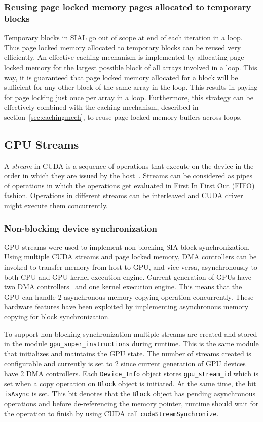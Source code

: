 \subsubsection{Reusing page locked memory pages allocated to temporary blocks}
Temporary blocks in SIAL go out of scope at end of each iteration in a loop. Thus page
locked memory allocated to temporary blocks can be reused very efficiently.
An effective caching mechanism is implemented by allocating page locked memory
for the largest possible block of all arrays involved in a loop. This
way, it is guaranteed that page locked memory allocated for a block will
be sufficient for any other block of the same array in the loop. This results
in paying for page locking just once per array in a loop. Furthermore, this
strategy can be effectively combined with the caching mechanism, described
in section~\ref{sec:cachingmech}, to reuse page locked memory buffers across
loops.

\subsection{GPU Streams}
A \textit{stream} in CUDA is a sequence of operations that execute on the device
in the order in which they are issued by the host~\cite{overlapdatatransfer}.
Streams can be considered as pipes of operations in which the operations get evaluated in
First In First Out (FIFO) fashion. Operations in different streams can be interleaved
and CUDA driver might execute them concurrently.

\subsubsection{Non-blocking device synchronization}\label{nonblockdevicesync}
GPU streams were used to implement non-blocking SIA block synchronization. Using
multiple CUDA streams and page locked memory, DMA controllers can be invoked to
transfer memory from host to GPU, and vice-versa, asynchronously to both CPU and GPU
kernel execution engine. Current generation of GPUs have two DMA
controllers~\cite{teslaspecs, teslakspecs} and one kernel execution engine.
This means that the GPU can handle 2 asynchronous memory copying operation concurrently.
These hardware features have been exploited by implementing asynchronous memory
copying for block synchronization.

To support non-blocking synchronization multiple streams are created and
stored in the module \texttt{gpu\_super\_instructions} during runtime. This is the same module
that initializes and
maintains the GPU state. The number of streams created is configurable and currently
is set to 2 since current generation of GPU devices have 2 DMA controllers. Each
\texttt{Device\_Info} object stores \texttt{gpu\_stream\_id} which is set when a
copy operation on \texttt{Block} object is initiated. At the same time, the bit
\texttt{isAsync} is set. This bit denotes that the \texttt{Block} object has pending
asynchronous operations and before de-referencing the memory pointer, runtime should
wait for the operation to finish by using CUDA call \texttt{cudaStreamSynchronize}.

